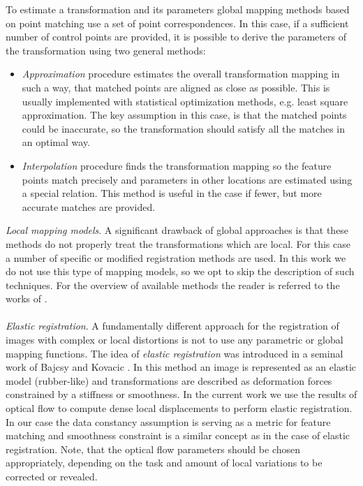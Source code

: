 To estimate a transformation and its parameters global mapping methods based on point matching use a set of point correspondences. In this case, if a sufficient number of control points are provided, it is possible to derive the parameters of the transformation using two general methods: 
\begin{itemize}
\item \textit{Approximation} procedure estimates the overall transformation mapping in such a way, that matched points are aligned as close as possible. This is usually implemented with statistical optimization methods, e.g. least square approximation. The key assumption in this case, is that the matched points could be inaccurate, so the transformation should satisfy all the matches in an optimal way.
   
\item \textit{Interpolation} procedure finds the transformation mapping so the feature points match precisely and parameters in other locations are estimated using a special relation. This method is useful in the case if fewer, but more accurate matches are provided.    
\end{itemize}


\noindent \textit{Local mapping models}.
A significant drawback of global approaches is that these methods do not properly treat the transformations which are local. For this case a number of specific or modified registration methods are used. 
In this work we do not use this type of mapping models, so we opt to skip the description of such techniques.  For the overview of available methods the reader is referred to the works of \cite{Brown92, Zitova03}.
\\
\\
\textit{Elastic registration}.
A fundamentally different approach for the registration of images with
complex or local distortions is not to use
any parametric or global mapping functions.
The idea of \textit{elastic registration} was introduced in a seminal work of Bajcsy and Kovacic \cite{Bajcsy89}. In this method an image is represented as an elastic model (rubber-like) and transformations are described as deformation forces constrained by a stiffness or smoothness.
In the current work we use the results of optical flow to compute dense local displacements to perform elastic registration. In our case the data constancy assumption is serving as a metric for feature matching and smoothness constraint is a similar concept as in the case of elastic registration. Note, that the optical flow parameters should be chosen appropriately, depending on the task and amount of local variations to be corrected or revealed. 
   

